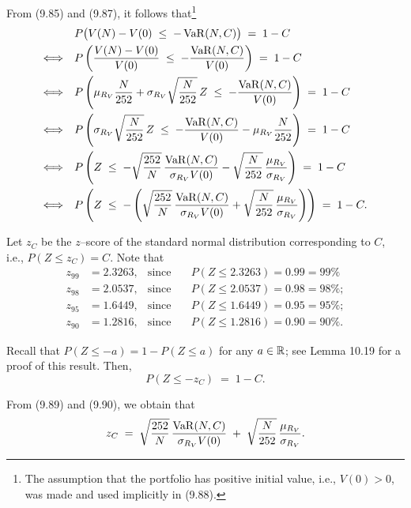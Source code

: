 From (9.85) and (9.87), it follows that\footnote{The assumption that the
portfolio has positive initial value, i.e., $V(0) > 0$, was made and used
implicitly in (9.88).}
\begin{align}
&P\bigl(V(N) - V(0) \;\le\; -\operatorname{VaR}(N,C)\bigr) \;=\; 1 - C \notag\\
\Longleftrightarrow\quad &P\left(\frac{V(N)-V(0)}{V(0)} \;\le\; -\frac{\operatorname{VaR}(N,C)}{V(0)}\right) \;=\; 1-C \\
\Longleftrightarrow\quad &P\left(\mu_{R_V}\frac{N}{252} + \sigma_{R_V}\sqrt{\frac{N}{252}}\,Z \;\le\; -\frac{\operatorname{VaR}(N,C)}{V(0)}\right) \;=\; 1-C \notag\\
\Longleftrightarrow\quad &P\left(\sigma_{R_V}\sqrt{\frac{N}{252}}\,Z \;\le\; -\frac{\operatorname{VaR}(N,C)}{V(0)} - \mu_{R_V}\frac{N}{252}\right) \;=\; 1-C \notag\\
\Longleftrightarrow\quad &P\left(Z \;\le\; -\sqrt{\frac{252}{N}}\,\frac{\operatorname{VaR}(N,C)}{\sigma_{R_V}V(0)} - \sqrt{\frac{N}{252}}\,\frac{\mu_{R_V}}{\sigma_{R_V}}\right) \;=\; 1-C \notag\\
\Longleftrightarrow\quad &P\left(Z \;\le\; -\left(\sqrt{\frac{252}{N}}\,\frac{\operatorname{VaR}(N,C)}{\sigma_{R_V}V(0)} + \sqrt{\frac{N}{252}}\,\frac{\mu_{R_V}}{\sigma_{R_V}}\right)\right) \;=\; 1-C.
\end{align}

Let $z_C$ be the $z$--score of the standard normal distribution corresponding
to $C$, i.e., $P(Z \le z_C) = C$. Note that
\[
\begin{aligned}
z_{99} &= 2.3263, & \text{since}\quad & P(Z \le 2.3263) = 0.99 = 99\%\\
z_{98} &= 2.0537, & \text{since}\quad & P(Z \le 2.0537) = 0.98 = 98\%;\\
z_{95} &= 1.6449, & \text{since}\quad & P(Z \le 1.6449) = 0.95 = 95\%;\\
z_{90} &= 1.2816, & \text{since}\quad & P(Z \le 1.2816) = 0.90 = 90\%.
\end{aligned}
\]

Recall that $P(Z \le -a) = 1 - P(Z\le a)$ for any $a\in\mathbb{R}$; see Lemma 10.19 for
a proof of this result. Then,
\begin{equation}
P(Z \le -z_C) \;=\; 1-C.
\end{equation}

From (9.89) and (9.90), we obtain that
\begin{equation}
z_C \;=\; \sqrt{\frac{252}{N}}\,\frac{\operatorname{VaR}(N,C)}{\sigma_{R_V}V(0)} \;+\; \sqrt{\frac{N}{252}}\,\frac{\mu_{R_V}}{\sigma_{R_V}}.
\end{equation}


